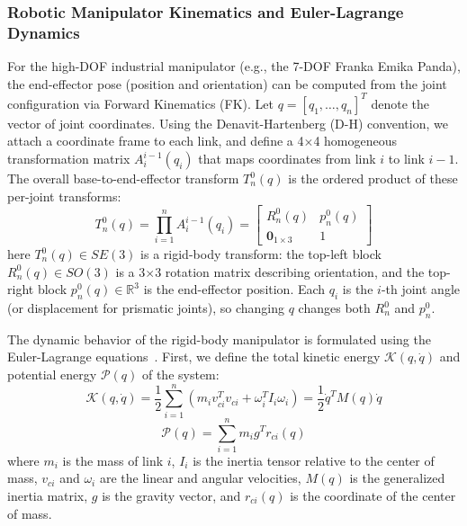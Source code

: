 \subsubsection{Robotic Manipulator Kinematics and Euler-Lagrange Dynamics}
For the high-DOF industrial manipulator (e.g., the 7-DOF Franka Emika Panda), the end-effector pose (position and orientation) can be computed from the joint configuration via Forward Kinematics (FK). Let $q=[q_1,\dots,q_n]^T$ denote the vector of joint coordinates. Using the Denavit-Hartenberg (D-H) convention, we attach a coordinate frame to each link, and define a 4$\times$4 homogeneous transformation matrix $A_i^{i-1}(q_i)$ that maps coordinates from link $i$ to link $i-1$. The overall base-to-end-effector transform $T_n^0(q)$ is the ordered product of these per-joint transforms:
\begin{equation}
    T_n^0(q) = \prod_{i=1}^n A_i^{i-1}(q_i) = \begin{bmatrix} R_n^0(q) & p_n^0(q) \\ \mathbf{0}_{1 \times 3} & 1 \end{bmatrix}
\end{equation}
here $T_n^0(q) \in SE(3)$ is a rigid-body transform: the top-left block $R_n^0(q) \in SO(3)$ is a 3$\times$3 rotation matrix describing orientation, and the top-right block $p_n^0(q) \in \mathbb{R}^3$ is the end-effector position. Each $q_i$ is the $i$-th joint angle (or displacement for prismatic joints), so changing $q$ changes both $R_n^0$ and $p_n^0$.

The dynamic behavior of the rigid-body manipulator is formulated using the Euler-Lagrange equations~\cite{RMPC}. First, we define the total kinetic energy $\mathcal{K}(q, \dot{q})$ and potential energy $\mathcal{P}(q)$ of the system:
\begin{equation}
    \mathcal{K}(q, \dot{q}) = \frac{1}{2} \sum_{i=1}^n \left( m_i v_{ci}^T v_{ci} + \omega_i^T I_i \omega_i \right) = \frac{1}{2} \dot{q}^T M(q) \dot{q}
\end{equation}
\begin{equation}
    \mathcal{P}(q) = \sum_{i=1}^n m_i g^T r_{ci}(q)
\end{equation}
where $m_i$ is the mass of link $i$, $I_i$ is the inertia tensor relative to the center of mass, $v_{ci}$ and $\omega_i$ are the linear and angular velocities, $M(q)$ is the generalized inertia matrix, $g$ is the gravity vector, and $r_{ci}(q)$ is the coordinate of the center of mass.

